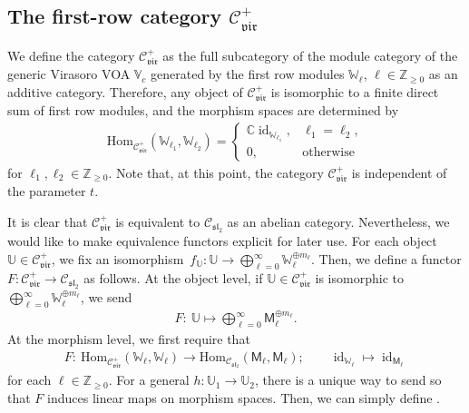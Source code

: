 \documentclass[10pt,a4paper]{amsart}
\numberwithin{equation}{section}
\newcommand{\Hom}{\mathrm{Hom}}
\newcommand{\id}{\operatorname{id}}
\newcommand{\bC}{\mathbb{C}}
\newcommand{\bZ}{\mathbb{Z}}
\newcommand{\cC}{\mathcal{C}}
\newcommand{\fsl}{\mathfrak{sl}}
\newcommand{\sfM}{\mathsf{M}}
\newcommand{\QGirrep}[1]{\sfM_{#1}}
\newcommand{\catQG}{\cC_{\fsl_{2}}}
\newcommand{\catVir}{\cC_{\vir}}
\newcommand{\virvoa}{\mathbb{V}}
\newcommand{\virmod}{\mathbb{W}}
\newcommand{\virmodgen}{\mathbb{U}}
\newcommand{\vir}{\mathfrak{vir}}
\begin{document}
\subsection[The first-row category catVir+]{The first-row category $\boldsymbol{\catVir^{+}}$}
We define the category $\catVir^{+}$ as the full subcategory of the module category of the generic Virasoro VOA $\virvoa_{c}$
generated by the first row modules $\virmod_{\ell}$, $\ell\in\bZ_{\geq 0}$ as an additive category.
Therefore, any object of $\catVir^{+}$ is isomorphic to a finite direct sum of first row modules,
and the morphism spaces are determined by
\begin{gather*}
 \Hom_{\catVir^{+}}(\virmod_{\ell_{1}},\virmod_{\ell_{2}})=
 \begin{cases}
 \bC \id_{\virmod_{\ell_{1}}},& \ell_{1}=\ell_{2},\\
 0, &\mathrm{otherwise}
 \end{cases}
\end{gather*}
for $\ell_{1},\ell_{2}\in\bZ_{\geq 0}$.
Note that, at this point, the category $\catVir^{+}$ is independent of the parameter $t$.

It is clear that $\catVir^{+}$ is equivalent to $\catQG$ as an abelian category.
Nevertheless, we would like to make equivalence functors explicit for later use.
For each object $\virmodgen\in\catVir^{+}$, we fix an isomorphism~${f_{\virmodgen}\colon \virmodgen\to\bigoplus_{\ell=0}^{\infty}\virmod_{\ell}^{\oplus m_{\ell}}}$.
Then, we define a functor $F\colon \catVir^{+}\to\catQG$ as follows.
At the object level, if $\virmodgen\in \catVir^{+}$ is isomorphic to $\bigoplus_{\ell=0}^{\infty}\virmod_{\ell}^{\oplus m_{\ell}}$, we send
\begin{gather*}
 F\colon\ \virmodgen\mapsto \bigoplus_{\ell=0}^{\infty}\QGirrep{\ell}^{\oplus m_{\ell}}.
\end{gather*}
At the morphism level, we first require that
\begin{gather*}
 F\colon\ \Hom_{\catVir^{+}}(\virmod_{\ell},\virmod_{\ell})\to \Hom_{\catQG}(\QGirrep{\ell},\QGirrep{\ell});\qquad \id_{\virmod_{\ell}}\mapsto \id_{\QGirrep{\ell}}
\end{gather*}
for each $\ell\in\bZ_{\geq 0}$.
For a general $h\colon \virmodgen_{1}\to\virmodgen_{2}$,
there is a unique way to send \smash{$f_{\virmodgen_{2}}\circ h\circ f_{\virmodgen_{1}}^{-1}$} so that $F$ induces linear maps on morphism spaces.
Then, we can simply define \smash{$F(h)=F\big(f_{\virmodgen_{2}}\circ h\circ f_{\virmodgen_{1}}^{-1}\big)$}.
\end{document}
